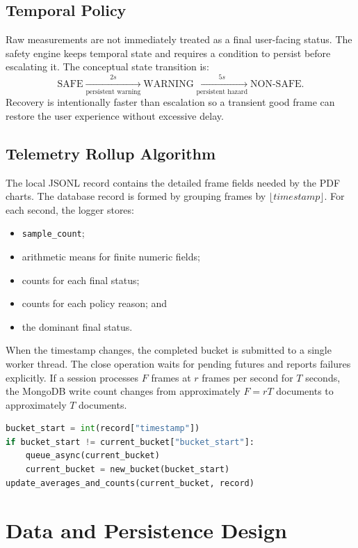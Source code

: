 \documentclass[12pt,a4paper]{report}
\newcommand{\code}[1]{\texttt{#1}}
\begin{document}
\section{Temporal Policy}
Raw measurements are not immediately treated as a final user-facing status.
The safety engine keeps temporal state and requires a condition to persist
before escalating it. The conceptual state transition is:
\[
\mathrm{SAFE}\xrightarrow[\text{persistent warning}]{2s}
\mathrm{WARNING}\xrightarrow[\text{persistent hazard}]{5s}
\mathrm{NON\text{-}SAFE}.
\]
Recovery is intentionally faster than escalation so a transient good frame can
restore the user experience without excessive delay.

\section{Telemetry Rollup Algorithm}
The local JSONL record contains the detailed frame fields needed by the PDF
charts. The database record is formed by grouping frames by
\(\lfloor timestamp \rfloor\). For each second, the logger stores:
\begin{itemize}
    \item \code{sample\_count};
    \item arithmetic means for finite numeric fields;
    \item counts for each final status;
    \item counts for each policy reason; and
    \item the dominant final status.
\end{itemize}
When the timestamp changes, the completed bucket is submitted to a single
worker thread. The close operation waits for pending futures and reports
failures explicitly. If a session processes \(F\) frames at \(r\) frames per
second for \(T\) seconds, the MongoDB write count changes from approximately
\(F=rT\) documents to approximately \(T\) documents.

\begin{lstlisting}[language=Python,caption={Conceptual rollup persistence}]
bucket_start = int(record["timestamp"])
if bucket_start != current_bucket["bucket_start"]:
    queue_async(current_bucket)
    current_bucket = new_bucket(bucket_start)
update_averages_and_counts(current_bucket, record)
\end{lstlisting}

\chapter{Data and Persistence Design}
\end{document}
